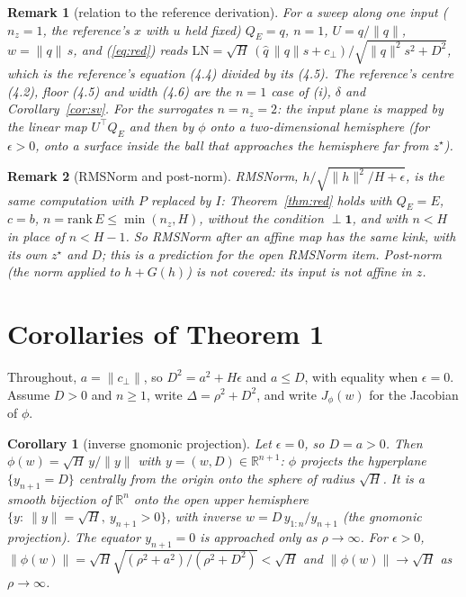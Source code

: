 \documentclass[11pt]{article}
\theoremstyle{plainnote}
\newtheorem{corollary}{Corollary}
\newtheorem{remark}{Remark}
\newcommand{\R}{\mathbb R}
\newcommand{\one}{\mathbf 1}
\newcommand{\cp}{c_\perp}
\begin{document}
\begin{remark}[relation to the reference derivation]
For a sweep along one input ($n_z=1$, the reference's $x$ with $u$ held fixed) $Q_E=q$, $n=1$, $U=q/\|q\|$, $w=\|q\|\,s$, and (\ref{eq:red}) reads $\mathrm{LN}=\sqrt H\,(\hat q\,\|q\|s+\cp)/\sqrt{\|q\|^2s^2+D^2}$, which is the reference's equation (4.4) divided by its (4.5). The reference's centre (4.2), floor (4.5) and width (4.6) are the $n=1$ case of (i), $\delta$ and Corollary~\ref{cor:sv}. For the surrogates $n=n_z=2$: the input plane is mapped by the linear map $U^\top Q_E$ and then by $\phi$ onto a two-dimensional hemisphere (for $\epsilon>0$, onto a surface inside the ball that approaches the hemisphere far from $z^\star$).
\end{remark}

\begin{remark}[RMSNorm and post-norm]
RMSNorm, $h/\sqrt{\|h\|^2/H+\epsilon}$, is the same computation with $P$ replaced by $I$: Theorem~\ref{thm:red} holds with $Q_E=E$, $c=b$, $n=\mathrm{rank}\,E\le\min(n_z,H)$, without the condition $\perp\one$, and with $n<H$ in place of $n<H-1$. So RMSNorm after an affine map has the same kink, with its own $z^\star$ and $D$; this is a prediction for the open RMSNorm item. Post-norm (the norm applied to $h+G(h)$) is not covered: its input is not affine in $z$.
\end{remark}

\section{Corollaries of Theorem 1}\label{sec:cors}

Throughout, $a=\|\cp\|$, so $D^2=a^2+H\epsilon$ and $a\le D$, with equality when $\epsilon=0$. Assume $D>0$ and $n\ge1$, write $\Delta=\rho^2+D^2$, and write $J_\phi(w)$ for the Jacobian of $\phi$.

\begin{corollary}[inverse gnomonic projection]\label{cor:gnomonic}
Let $\epsilon=0$, so $D=a>0$. Then $\phi(w)=\sqrt H\,y/\|y\|$ with $y=(w,D)\in\R^{n+1}$: $\phi$ projects the hyperplane $\{y_{n+1}=D\}$ centrally from the origin onto the sphere of radius $\sqrt H$. It is a smooth bijection of $\R^n$ onto the open upper hemisphere $\{y:\ \|y\|=\sqrt H,\ y_{n+1}>0\}$, with inverse $w=D\,y_{1:n}/y_{n+1}$ (the gnomonic projection). The equator $y_{n+1}=0$ is approached only as $\rho\to\infty$. For $\epsilon>0$, $\|\phi(w)\|=\sqrt H\sqrt{(\rho^2+a^2)/(\rho^2+D^2)}<\sqrt H$ and $\|\phi(w)\|\to\sqrt H$ as $\rho\to\infty$.
\end{corollary}
\end{document}
